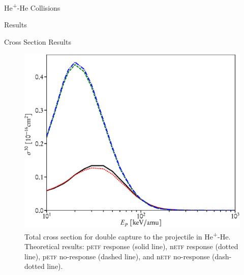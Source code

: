 \documentclass[a5paper, 9 pt]{extreport}
\begin{document}
\begin{chapter}{\texorpdfstring{He\textsuperscript{+}}{He+}-He Collisions \label{chap:hephe}}
\begin{section}{Results \label{sec:hephe-disc}}
\begin{subsection}{Cross Section Results \label{sec:hephe-res}}
\begin{figure}[t]
\begin{minipage}{.49\linewidth}
               \includegraphics[width = \linewidth]{./images/hephe-cross/HepHe-030.eps}
               \caption[Total cross section for double capture to the projectile in
                        He\textsuperscript{+}-He]
                       {Total cross section for double capture to the projectile in
                        He\textsuperscript{+}-He.
                        Theoretical results: p\textsc{etf} response (solid line), n\textsc{etf} response
                                             (dotted line), p\textsc{etf} no-response (dashed line), and
                                             n\textsc{etf} no-response (dash-dotted line).
                        \label{fig:cs030}}
            \end{minipage}
         \end{figure}


\end{subsection}
\end{section}
\end{chapter}
\end{document}
